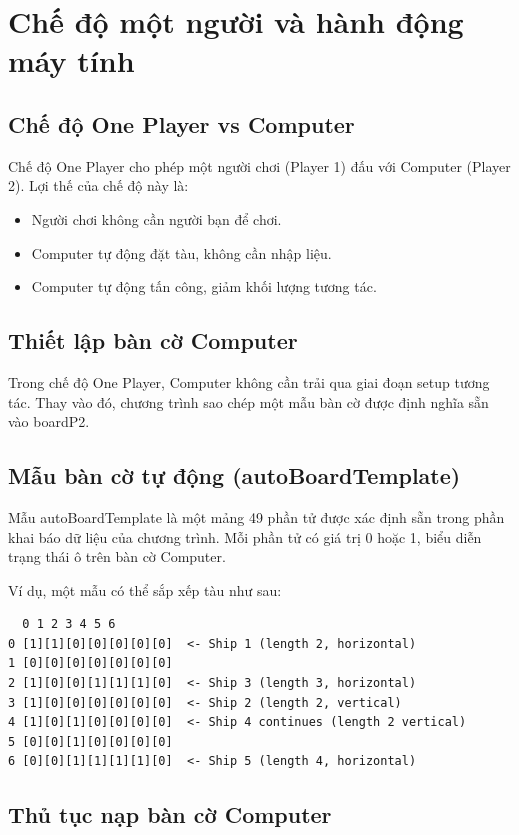 
\section{Chế độ một người và hành động máy tính}

\subsection{Chế độ One Player vs Computer}

Chế độ One Player cho phép một người chơi (Player 1) đấu với Computer (Player 2). Lợi thế của chế độ này là:
\begin{itemize}
    \item Người chơi không cần người bạn để chơi.
    \item Computer tự động đặt tàu, không cần nhập liệu.
    \item Computer tự động tấn công, giảm khối lượng tương tác.
\end{itemize}

\subsection{Thiết lập bàn cờ Computer}

Trong chế độ One Player, Computer không cần trải qua giai đoạn setup tương tác. Thay vào đó, chương trình sao chép một mẫu bàn cờ được định nghĩa sẵn vào boardP2.

\subsection{Mẫu bàn cờ tự động (autoBoardTemplate)}

Mẫu autoBoardTemplate là một mảng 49 phần tử được xác định sẵn trong phần khai báo dữ liệu của chương trình. Mỗi phần tử có giá trị 0 hoặc 1, biểu diễn trạng thái ô trên bàn cờ Computer.

Ví dụ, một mẫu có thể sắp xếp tàu như sau:
\begin{verbatim}
  0 1 2 3 4 5 6
0 [1][1][0][0][0][0][0]  <- Ship 1 (length 2, horizontal)
1 [0][0][0][0][0][0][0]
2 [1][0][0][1][1][1][0]  <- Ship 3 (length 3, horizontal)
3 [1][0][0][0][0][0][0]  <- Ship 2 (length 2, vertical)
4 [1][0][1][0][0][0][0]  <- Ship 4 continues (length 2 vertical)
5 [0][0][1][0][0][0][0]
6 [0][0][1][1][1][1][0]  <- Ship 5 (length 4, horizontal)
\end{verbatim}

\subsection{Thủ tục nạp bàn cờ Computer}

